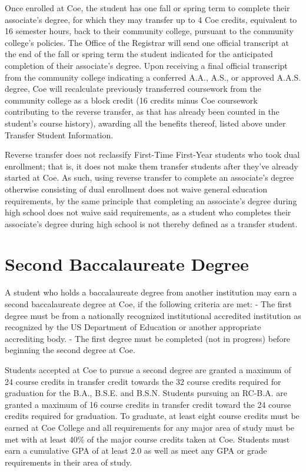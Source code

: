 \documentclass[
  letterpaper,
]{scrbook}
\begin{document}
Once enrolled at Coe, the student has one fall or spring term to
complete their associate's degree, for which they may transfer up to 4
Coe credits, equivalent to 16 semester hours, back to their community
college, pursuant to the community college's policies. The Office of the
Registrar will send one official transcript at the end of the fall or
spring term the student indicated for the anticipated completion of
their associate's degree. Upon receiving a final official transcript
from the community college indicating a conferred A.A., A.S., or
approved A.A.S. degree, Coe will recalculate previously transferred
coursework from the community college as a block credit (16 credits
minus Coe coursework contributing to the reverse transfer, as that has
already been counted in the student's course history), awarding all the
benefits thereof, listed above under Transfer Student Information.

Reverse transfer does not reclassify First-Time First-Year students who
took dual enrollment; that is, it does not make them transfer students
after they've already started at Coe. As such, using reverse transfer to
complete an associate's degree otherwise consisting of dual enrollment
does not waive general education requirements, by the same principle
that completing an associate's degree during high school does not waive
said requirements, as a student who completes their associate's degree
during high school is not thereby defined as a transfer student.

\section{Second Baccalaureate Degree}\label{second-baccalaureate-degree}

A student who holds a baccalaureate degree from another institution may
earn a second baccalaureate degree at Coe, if the following criteria are
met: - The first degree must be from a nationally recognized
institutional accredited institution as recognized by the US Department
of Education or another appropriate accrediting body. - The first degree
must be completed (not in progress) before beginning the second degree
at Coe.

Students accepted at Coe to pursue a second degree are granted a maximum
of 24 course credits in transfer credit towards the 32 course credits
required for graduation for the B.A., B.S.E. and B.S.N. Students
pursuing an RC-B.A. are granted a maximum of 16 course credits in
transfer credit toward the 24 course credits required for graduation. To
graduate, at least eight course credits must be earned at Coe College
and all requirements for any major area of study must be met with at
least 40\% of the major course credits taken at Coe. Students must earn
a cumulative GPA of at least 2.0 as well as meet any GPA or grade
requirements in their area of study.
\end{document}
